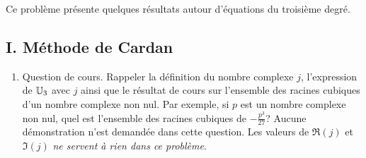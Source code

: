 Ce problème présente quelques résultats autour d'équations du troisième degré.
\subsection*{I. Méthode de Cardan}
\begin{enumerate}
 \item Question de cours. Rappeler la définition du nombre complexe $j$, l'expression de $\mathbb{U}_3$ avec $j$ ainsi que le résultat de cours sur l'ensemble des racines cubiques d'un nombre complexe non nul.\newline
 Par exemple, si $p$ est un nombre complexe non nul, quel est l'ensemble des racines cubiques de $-\frac{p^3}{27}$?\newline
 Aucune démonstration n'est demandée dans cette question. Les valeurs de $\Re(j)$ et $\Im(j)$ \emph{ne servent à rien dans ce problème}. 


\end{enumerate}

